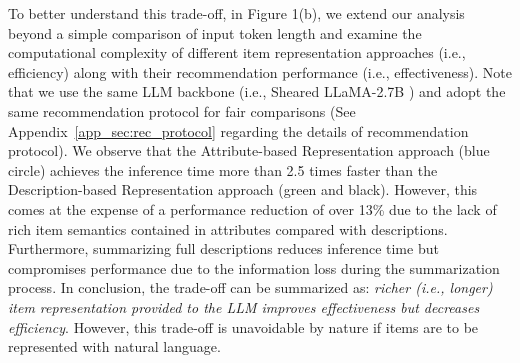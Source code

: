 \documentclass[sigconf]{acmart}
\begin{document}
To better understand this trade-off, in Figure 1(b), we extend our analysis beyond a simple comparison of input token length and examine the computational complexity of different item representation approaches (i.e., efficiency) along with their recommendation performance (i.e., effectiveness).
Note that we use the same LLM backbone (i.e., Sheared LLaMA-2.7B \cite{xia2023sheared}) and adopt the same recommendation protocol for fair comparisons (See Appendix~\ref{app_sec:rec_protocol} regarding the details of recommendation protocol).
We observe that the Attribute-based Representation approach (blue circle) achieves the inference time more than 2.5 times faster than the Description-based Representation approach (green and black). However, this comes at the expense of a performance reduction of over 13\% due to the lack of rich item semantics contained in attributes compared with descriptions.
Furthermore, summarizing full descriptions reduces inference time but compromises performance due to the information loss during the summarization process. 
In conclusion, the trade-off can be summarized as: \textit{richer (i.e., longer) item representation provided to the LLM improves effectiveness but decreases efficiency}. However, this trade-off is unavoidable by nature if items are to be represented with natural language.
\end{document}
